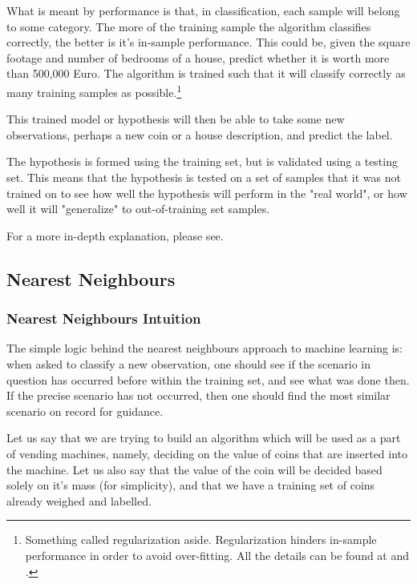 \documentclass[a4paper, 12pt]{article}
\begin{document}
            \par What is meant by performance is that, in classification, each sample will belong to some category. The more of the training sample the algorithm classifies correctly, the better is it's in-sample performance. This could be, given the square footage and number of bedrooms of a house, predict whether it is worth more than 500,000 Euro. The algorithm is trained such that it will classify correctly as many training samples as possible.\footnote{Something called regularization aside. Regularization hinders in-sample performance in order to avoid over-fitting. All the details can be found at \cite{overfitting} and \cite{regularization}.}
            
            \par This trained model or hypothesis will then be able to take some new observations, perhaps a new coin or a house description, and predict the label.
            
            \par The hypothesis is formed using the training set, but is validated using a testing set. This means that the hypothesis is tested on a set of samples that it was not trained on to see how well the hypothesis will perform in the "real world", or how well it will "generalize" to out-of-training set samples.
            
            \par For a more in-depth explanation, please see\cite{machineLearningBackground}.

        \subsection{Nearest Neighbours}

            \subsubsection{Nearest Neighbours Intuition}

                \par The simple logic behind the nearest neighbours approach to machine learning is: when asked to classify a new observation, one should see if the scenario in question has occurred before within the training set, and see what was done then. If the precise scenario has not occurred, then one should find the most similar scenario on record for guidance.

                \par Let us say that we are trying to build an algorithm which will be used as a part of vending machines, namely, deciding on the value of coins that are inserted into the machine. Let us also say that the value of the coin will be decided based solely on it's mass (for simplicity), and that we have a training set of coins already weighed and labelled.
\end{document}
